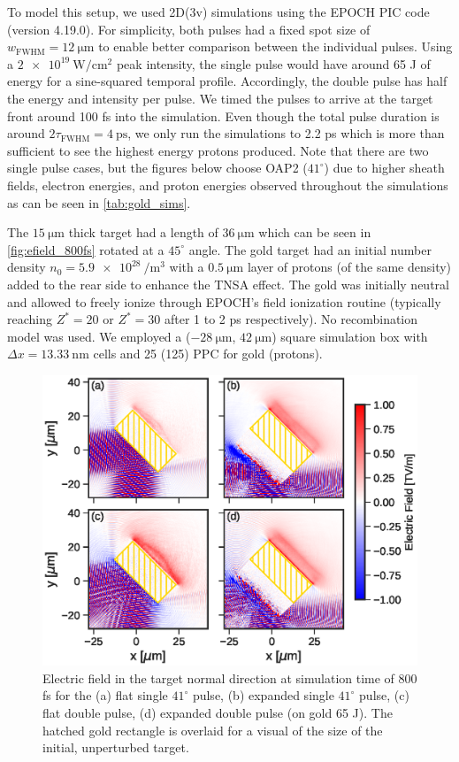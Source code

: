 To model this setup, we used 2D(3v) simulations using the EPOCH \gls{PIC} code (version 4.19.0). For simplicity, both pulses had a fixed spot size of $w_\text{FWHM} = \SI{12}{\micro \meter}$ to enable better comparison between the individual pulses. Using a $\SI{2e19}{\watt \per \centi \meter \squared}$ peak intensity, the single pulse would have around 65 J of energy for a sine-squared temporal profile. Accordingly, the double pulse has half the energy and intensity per pulse. We timed the pulses to arrive at the target front around 100 fs into the simulation. Even though the total pulse duration is around $2 \tau_\text{FWHM} = \SI{4}{\pico \second}$, we only run the simulations to 2.2 ps which is more than sufficient to see the highest energy protons produced. Note that there are two single pulse cases, but the figures below choose \gls{OAP}2 ($41^\circ$) due to higher sheath fields, electron energies, and proton energies observed throughout the simulations as can be seen in \autoref{tab:gold_sims}.

The $\SI{15}{\micro \meter}$ thick target had a length of $\SI{36}{\micro \meter}$ which can be seen in \autoref{fig:efield_800fs} rotated at a $45^\circ$ angle. The gold target had an initial number density $n_0 = \SI{5.9e28}{\per \meter \cubed}$ with a $\SI{0.5}{\micro \meter}$ layer of protons (of the same density) added to the rear side to enhance the \gls{TNSA} effect. The gold was initially neutral and allowed to freely ionize through EPOCH's field ionization routine (typically reaching $Z^* = 20$ or $Z^* = 30$ after 1 to 2 ps respectively). No recombination model was used. We employed a ($-\SI{28}{\micro \meter}$, $\SI{42}{\micro \meter}$) square simulation box with $\Delta x = \SI{13.33}{\nano \meter}$ cells and 25 (125) \gls{PPC} for gold (protons).

\begin{figure}
	\centering
	\includegraphics[width=0.9\linewidth]{planning/images/titan/efield_800fs.eps}
	\caption{Electric field in the target normal direction at simulation time of 800 fs for the (a) flat single $41^\circ$ pulse, (b) expanded single $41^\circ$ pulse, (c) flat double pulse, (d) expanded double pulse (on gold 65 J). The hatched gold rectangle is overlaid for a visual of the size of the initial, unperturbed target.}
	\label{fig:efield_800fs}
\end{figure}

